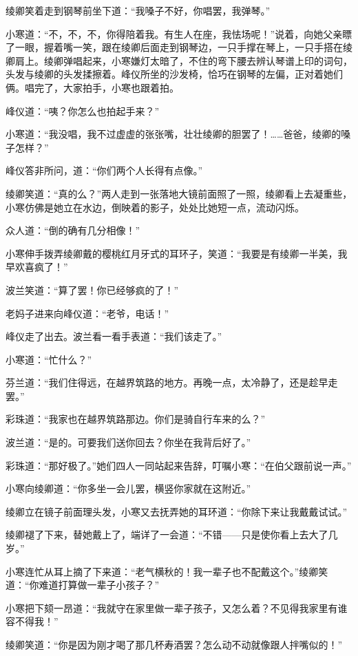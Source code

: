 \par 绫卿笑着走到钢琴前坐下道：“我嗓子不好，你唱罢，我弹琴。”
\par 小寒道：“不，不，不，你得陪着我。有生人在座，我怯场呢！”说着，向她父亲瞟了一眼，握着嘴一笑，跟在绫卿后面走到钢琴边，一只手撑在琴上，一只手搭在绫卿肩上。绫卿弹唱起来，小寒嫌灯太暗了，不住的弯下腰去辨认琴谱上印的词句，头发与绫卿的头发揉擦着。峰仪所坐的沙发椅，恰巧在钢琴的左偏，正对着她们俩。唱完了，大家拍手，小寒也跟着拍。
\par 峰仪道：“咦？你怎么也拍起手来？”
\par 小寒道：“我没唱，我不过虚虚的张张嘴，壮壮绫卿的胆罢了！……爸爸，绫卿的嗓子怎样？”
\par 峰仪答非所问，道：“你们两个人长得有点像。”
\par 绫卿笑道：“真的么？”两人走到一张落地大镜前面照了一照，绫卿看上去凝重些，小寒仿佛是她立在水边，倒映着的影子，处处比她短一点，流动闪烁。
\par 众人道：“倒的确有几分相像！”
\par 小寒伸手拨弄绫卿戴的樱桃红月牙式的耳环子，笑道：“我要是有绫卿一半美，我早欢喜疯了！”
\par 波兰笑道：“算了罢！你已经够疯的了！”
\par 老妈子进来向峰仪道：“老爷，电话！”
\par 峰仪走了出去。波兰看一看手表道：“我们该走了。”
\par 小寒道：“忙什么？”
\par 芬兰道：“我们住得远，在越界筑路的地方。再晚一点，太冷静了，还是趁早走罢。”
\par 彩珠道：“我家也在越界筑路那边。你们是骑自行车来的么？”
\par 波兰道：“是的。可要我们送你回去？你坐在我背后好了。”
\par 彩珠道：“那好极了。”她们四人一同站起来告辞，叮嘱小寒：“在伯父跟前说一声。”
\par 小寒向绫卿道：“你多坐一会儿罢，横竖你家就在这附近。”
\par 绫卿立在镜子前面理头发，小寒又去抚弄她的耳环道：“你除下来让我戴戴试试。”
\par 绫卿褪了下来，替她戴上了，端详了一会道：“不错——只是使你看上去大了几岁。”
\par 小寒连忙从耳上摘了下来道：“老气横秋的！我一辈子也不配戴这个。”绫卿笑道：“你难道打算做一辈子小孩子？”
\par 小寒把下颏一昂道：“我就守在家里做一辈子孩子，又怎么着？不见得我家里有谁容不得我！”
\par 绫卿笑道：“你是因为刚才喝了那几杯寿酒罢？怎么动不动就像跟人拌嘴似的！”
